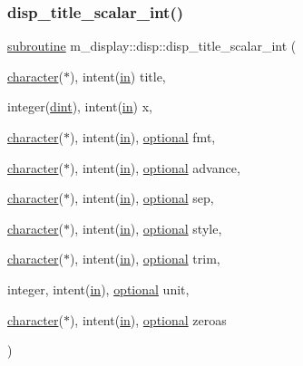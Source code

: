 \subsubsection{\texorpdfstring{disp\+\_\+title\+\_\+scalar\+\_\+int()}{disp\_title\_scalar\_int()}}
{\footnotesize\ttfamily \hyperlink{M__stopwatch_83_8txt_acfbcff50169d691ff02d4a123ed70482}{subroutine} m\+\_\+display\+::disp\+::disp\+\_\+title\+\_\+scalar\+\_\+int (\begin{DoxyParamCaption}\item[{\hyperlink{option__stopwatch_83_8txt_abd4b21fbbd175834027b5224bfe97e66}{character}($\ast$), intent(\hyperlink{M__journal_83_8txt_afce72651d1eed785a2132bee863b2f38}{in})}]{title,  }\item[{integer(\hyperlink{namespacem__display_a73f772e9702cad6f40b78364fde2c7cd}{dint}), intent(\hyperlink{M__journal_83_8txt_afce72651d1eed785a2132bee863b2f38}{in})}]{x,  }\item[{\hyperlink{option__stopwatch_83_8txt_abd4b21fbbd175834027b5224bfe97e66}{character}($\ast$), intent(\hyperlink{M__journal_83_8txt_afce72651d1eed785a2132bee863b2f38}{in}), \hyperlink{option__stopwatch_83_8txt_aa4ece75e7acf58a4843f70fe18c3ade5}{optional}}]{fmt,  }\item[{\hyperlink{option__stopwatch_83_8txt_abd4b21fbbd175834027b5224bfe97e66}{character}($\ast$), intent(\hyperlink{M__journal_83_8txt_afce72651d1eed785a2132bee863b2f38}{in}), \hyperlink{option__stopwatch_83_8txt_aa4ece75e7acf58a4843f70fe18c3ade5}{optional}}]{advance,  }\item[{\hyperlink{option__stopwatch_83_8txt_abd4b21fbbd175834027b5224bfe97e66}{character}($\ast$), intent(\hyperlink{M__journal_83_8txt_afce72651d1eed785a2132bee863b2f38}{in}), \hyperlink{option__stopwatch_83_8txt_aa4ece75e7acf58a4843f70fe18c3ade5}{optional}}]{sep,  }\item[{\hyperlink{option__stopwatch_83_8txt_abd4b21fbbd175834027b5224bfe97e66}{character}($\ast$), intent(\hyperlink{M__journal_83_8txt_afce72651d1eed785a2132bee863b2f38}{in}), \hyperlink{option__stopwatch_83_8txt_aa4ece75e7acf58a4843f70fe18c3ade5}{optional}}]{style,  }\item[{\hyperlink{option__stopwatch_83_8txt_abd4b21fbbd175834027b5224bfe97e66}{character}($\ast$), intent(\hyperlink{M__journal_83_8txt_afce72651d1eed785a2132bee863b2f38}{in}), \hyperlink{option__stopwatch_83_8txt_aa4ece75e7acf58a4843f70fe18c3ade5}{optional}}]{trim,  }\item[{integer, intent(\hyperlink{M__journal_83_8txt_afce72651d1eed785a2132bee863b2f38}{in}), \hyperlink{option__stopwatch_83_8txt_aa4ece75e7acf58a4843f70fe18c3ade5}{optional}}]{unit,  }\item[{\hyperlink{option__stopwatch_83_8txt_abd4b21fbbd175834027b5224bfe97e66}{character}($\ast$), intent(\hyperlink{M__journal_83_8txt_afce72651d1eed785a2132bee863b2f38}{in}), \hyperlink{option__stopwatch_83_8txt_aa4ece75e7acf58a4843f70fe18c3ade5}{optional}}]{zeroas }\end{DoxyParamCaption})\hspace{0.3cm}{\ttfamily [private]}}

